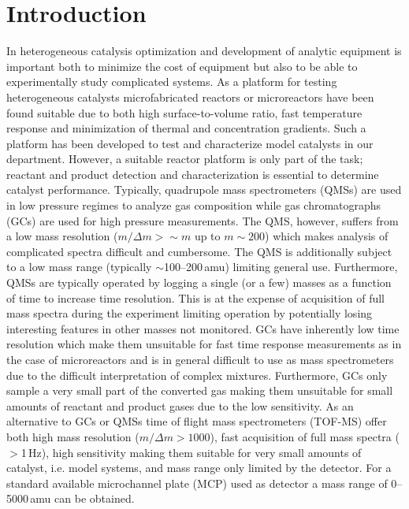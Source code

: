 \documentclass[aip,rsi]{revtex4-1}
\begin{document}
\pacs{}%

\maketitle %

\section{Introduction}
In heterogeneous catalysis optimization and development of analytic equipment is important both to minimize the cost of equipment but also to be able to experimentally study complicated systems. As a platform for testing heterogeneous catalysts microfabricated reactors or microreactors have been found suitable due to both high surface-to-volume ratio, fast temperature response and minimization of thermal and concentration gradients\cite{Jensen2001,Jaehnisch2004}. Such a platform has been developed to test and characterize model catalysts in our department\cite{Henriksen2009}. However, a suitable reactor platform is only part of the task; reactant and product detection and characterization is essential to determine catalyst performance. Typically, quadrupole mass spectrometers (QMSs) are used in low pressure regimes to analyze gas composition while gas chromatographs (GCs) are used for high pressure measurements. The QMS, however, suffers from a low mass resolution ($m/\Delta m>\sim m$ up to $m\sim200$) which makes analysis of complicated spectra difficult and cumbersome. The QMS is additionally subject to a low mass range (typically $\sim$\mbox{100--200}\,amu) limiting general use. Furthermore, QMSs are typically operated by logging a single (or a few) masses as a function of time to increase time resolution. This is at the expense of acquisition of full mass spectra during the experiment limiting operation by potentially losing interesting features in other masses not monitored. GCs have inherently low time resolution which make them unsuitable for fast time response measurements as in the case of microreactors and is in general difficult to use as mass spectrometers due to the difficult interpretation of complex mixtures. Furthermore, GCs only sample a very small part of the converted gas making them unsuitable for small amounts of reactant and product gases due to the low sensitivity. As an alternative to GCs or QMSs time of flight mass spectrometers (TOF-MS) offer both high mass resolution ($m/\Delta m>1000$), fast acquisition of full mass spectra ($>$1\,Hz), high sensitivity making them suitable for very small amounts of catalyst, i.e. model systems, and mass range only limited by the detector. For a standard available microchannel plate (MCP) used as detector a mass range of \mbox{0--5000}\,amu can be obtained. 
\end{document}
